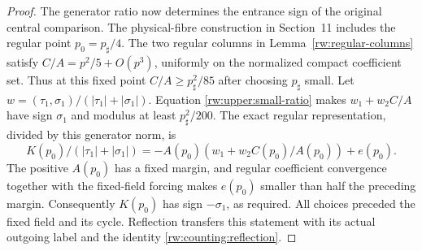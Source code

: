 \begin{proof}
The generator ratio now determines the entrance sign of the original
central comparison.
The physical-fibre construction in Section~11 includes the regular
point $p_0=p_\sharp/4$. The two regular columns in
Lemma~\ref{rw:regular-columns} satisfy
$C/A=p^2/5+O(p^3)$, uniformly on the normalized compact coefficient
set. Thus at this fixed point $C/A\ge p_\sharp^2/85$ after
choosing $p_\sharp$ small. Let
$w=(\tau_1,\sigma_1)/(|\tau_1|+|\sigma_1|)$.
Equation \eqref{rw:upper:small-ratio} makes
$w_1+w_2C/A$ have sign $\sigma_1$ and modulus at least
$p_\sharp^2/200$. The exact regular representation, divided by
this generator norm, is
\[
 K(p_0)/(|\tau_1|+|\sigma_1|)
          =-A(p_0)(w_1+w_2C(p_0)/A(p_0))+e(p_0).
\]
The positive $A(p_0)$ has a fixed margin, and regular coefficient
convergence together with the fixed-field forcing makes $e(p_0)$
smaller than half the preceding margin. Consequently $K(p_0)$ has
sign $-\sigma_1$, as required. All choices preceded the fixed field
and its cycle. Reflection transfers this statement with its actual
outgoing label and the identity \eqref{rw:counting:reflection}.
\end{proof}
